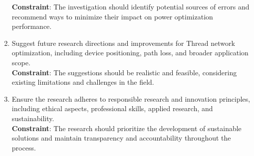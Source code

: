 \begin{enumerate}
    \textbf{Constraint}: The investigation should identify potential sources of errors and recommend ways to minimize their impact on power optimization performance.
    \item Suggest future research directions and improvements for Thread network optimization, including device positioning, path loss, and broader application scope.\\
    \textbf{Constraint}: The suggestions should be realistic and feasible, considering existing limitations and challenges in the field.
    \item Ensure the research adheres to responsible research and innovation principles, including ethical aspects, professional skills, applied research, and sustainability.\\
    \textbf{Constraint}: The research should prioritize the development of sustainable solutions and maintain transparency and accountability throughout the process.
\end{enumerate}
